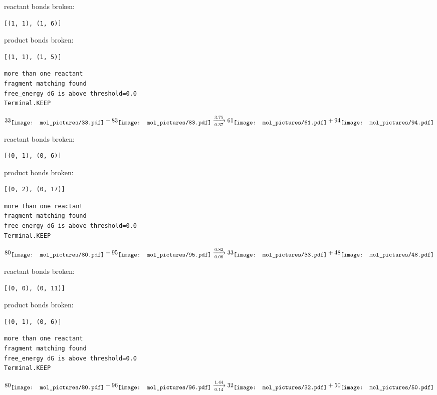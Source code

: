 \documentclass{article}
\begin{document}
reactant bonds broken:\begin{verbatim}
[(1, 1), (1, 6)]
\end{verbatim}
product bonds broken:\begin{verbatim}
[(1, 1), (1, 5)]
\end{verbatim}




\vspace{1cm}
\begin{verbatim}
more than one reactant
fragment matching found
free_energy dG is above threshold=0.0
Terminal.KEEP
\end{verbatim}
$$
33
\raisebox{-.5\height}{\texttt{[image: mol\_pictures/33.pdf]}}
+
83
\raisebox{-.5\height}{\texttt{[image: mol\_pictures/83.pdf]}}
\xrightarrow[0.37]{3.75}
61
\raisebox{-.5\height}{\texttt{[image: mol\_pictures/61.pdf]}}
+
94
\raisebox{-.5\height}{\texttt{[image: mol\_pictures/94.pdf]}}
$$


reactant bonds broken:\begin{verbatim}
[(0, 1), (0, 6)]
\end{verbatim}
product bonds broken:\begin{verbatim}
[(0, 2), (0, 17)]
\end{verbatim}




\vspace{1cm}
\begin{verbatim}
more than one reactant
fragment matching found
free_energy dG is above threshold=0.0
Terminal.KEEP
\end{verbatim}
$$
80
\raisebox{-.5\height}{\texttt{[image: mol\_pictures/80.pdf]}}
+
95
\raisebox{-.5\height}{\texttt{[image: mol\_pictures/95.pdf]}}
\xrightarrow[0.08]{0.82}
33
\raisebox{-.5\height}{\texttt{[image: mol\_pictures/33.pdf]}}
+
48
\raisebox{-.5\height}{\texttt{[image: mol\_pictures/48.pdf]}}
$$


reactant bonds broken:\begin{verbatim}
[(0, 0), (0, 11)]
\end{verbatim}
product bonds broken:\begin{verbatim}
[(0, 1), (0, 6)]
\end{verbatim}




\vspace{1cm}
\begin{verbatim}
more than one reactant
fragment matching found
free_energy dG is above threshold=0.0
Terminal.KEEP
\end{verbatim}
$$
80
\raisebox{-.5\height}{\texttt{[image: mol\_pictures/80.pdf]}}
+
96
\raisebox{-.5\height}{\texttt{[image: mol\_pictures/96.pdf]}}
\xrightarrow[0.14]{1.44}
32
\raisebox{-.5\height}{\texttt{[image: mol\_pictures/32.pdf]}}
+
50
\raisebox{-.5\height}{\texttt{[image: mol\_pictures/50.pdf]}}
$$
\end{document}
